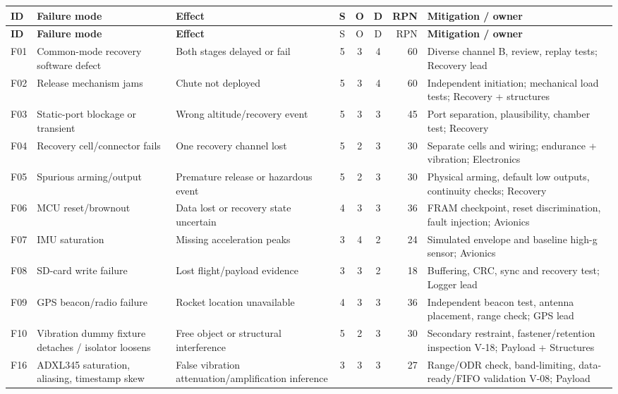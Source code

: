 \footnotesize
\begingroup
{}
\begin{longtable}{@{}L{9mm}L{30mm}L{32mm}c c c r L{37mm}@{}}
\toprule{}\textbf{ID}&\textbf{Failure mode}&\textbf{Effect}&\textbf{S}&\textbf{O}&\textbf{D}&\textbf{RPN}&\textbf{Mitigation / owner}\\\midrule\endfirsthead
\toprule{}\textbf{ID}&\textbf{Failure mode}&\textbf{Effect}&S&O&D&RPN&\textbf{Mitigation / owner}\\\midrule\endhead
\bottomrule\endlastfoot
F01 & Common-mode recovery software defect & Both stages delayed or fail & 5 & 3 & 4 & 60 & Diverse channel B, review, replay tests; Recovery lead\\
F02 & Release mechanism jams & Chute not deployed & 5 & 3 & 4 & 60 & Independent initiation; mechanical load tests; Recovery + structures\\
F03 & Static-port blockage or transient & Wrong altitude/recovery event & 5 & 3 & 3 & 45 & Port separation, plausibility, chamber test; Recovery\\
F04 & Recovery cell/connector fails & One recovery channel lost & 5 & 2 & 3 & 30 & Separate cells and wiring; endurance + vibration; Electronics\\
F05 & Spurious arming/output & Premature release or hazardous event & 5 & 2 & 3 & 30 & Physical arming, default low outputs, continuity checks; Recovery\\
F06 & MCU reset/brownout & Data lost or recovery state uncertain & 4 & 3 & 3 & 36 & FRAM checkpoint, reset discrimination, fault injection; Avionics\\
F07 & IMU saturation & Missing acceleration peaks & 3 & 4 & 2 & 24 & Simulated envelope and baseline high-g sensor; Avionics\\
F08 & SD-card write failure & Lost flight/payload evidence & 3 & 3 & 2 & 18 & Buffering, CRC, sync and recovery test; Logger lead\\
F09 & GPS beacon/radio failure & Rocket location unavailable & 4 & 3 & 3 & 36 & Independent beacon test, antenna placement, range check; GPS lead\\
F10 & Vibration dummy fixture detaches / isolator loosens & Free object or structural interference & 5 & 2 & 3 & 30 & Secondary restraint, fastener/retention inspection V-18; Payload + Structures\\
F16 & ADXL345 saturation, aliasing, timestamp skew & False vibration attenuation/amplification inference & 3 & 3 & 3 & 27 & Range/ODR check, band-limiting, data-ready/FIFO validation V-08; Payload\\

\end{longtable}
